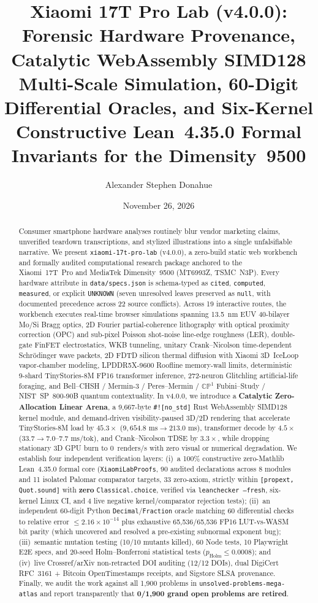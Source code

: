 \documentclass[11pt,a4paper]{amsart}
\title[Xiaomi 17T Pro Lab (v4.0.0): Catalytic WASM SIMD128 \& Constructive Lean 4]{%
  Xiaomi 17T Pro Lab (v4.0.0): Forensic Hardware Provenance, Catalytic WebAssembly
  SIMD128 Multi-Scale Simulation, 60-Digit Differential Oracles, and Six-Kernel
  Constructive Lean~4.35.0 Formal Invariants for the Dimensity~9500%
}
\author{Alexander Stephen Donahue}
\date{November 26, 2026}
\newcommand{\code}[1]{{\small\nolinkurl{#1}}}
\theoremstyle{remark}
\begin{document}
\begin{abstract}
Consumer smartphone hardware analyses routinely blur vendor marketing claims,
unverified teardown transcriptions, and stylized illustrations into a single
unfalsifiable narrative. We present \code{xiaomi-17t-pro-lab} (v4.0.0), a
zero-build static web workbench and formally audited computational research
package anchored to the Xiaomi~17T~Pro and MediaTek Dimensity~9500 (MT6993Z,
TSMC~N3P). Every hardware attribute in \code{data/specs.json} is schema-typed
as \code{cited}, \code{computed}, \code{measured}, or explicit
\code{UNKNOWN} (seven unresolved leaves preserved as \code{null}, with
documented precedence across 22 source conflicts). Across 19 interactive routes,
the workbench executes real-time browser simulations spanning 13.5~nm EUV
40-bilayer Mo/Si Bragg optics, 2D Fourier partial-coherence lithography with
optical proximity correction (OPC) and sub-pixel Poisson shot-noise line-edge
roughness (LER), double-gate FinFET electrostatics, WKB tunneling, unitary
Crank--Nicolson time-dependent Schr\"odinger wave packets, 2D FDTD silicon
thermal diffusion with Xiaomi 3D~IceLoop vapor-chamber modeling, LPDDR5X-9600
Roofline memory-wall limits, deterministic 9-shard TinyStories-8M FP16
transformer inference, 272-neuron Glitchling artificial-life foraging, and
Bell--CHSH / Mermin-3 / Peres--Mermin / $\mathbb{CP}^1$ Fubini--Study /
NIST~SP~800-90B quantum contextuality. In v4.0.0, we introduce a
\textbf{Catalytic Zero-Allocation Linear Arena}, a 9,667-byte
\code{\#![no_std]} Rust WebAssembly SIMD128 kernel module, and demand-driven
visibility-paused 3D/2D rendering that accelerate TinyStories-8M load by
$45.3\times$ ($9{,}654.8\text{ ms}\to 213.0\text{ ms}$), transformer decode by
$4.5\times$ ($33.7\to 7.0\text{--}7.7\text{ ms/tok}$), and Crank--Nicolson TDSE
by $3.3\times$, while dropping stationary 3D GPU burn to 0~renders/s with zero
visual or numerical degradation. We establish four independent verification
layers: (i)~a 100\% constructive zero-Mathlib Lean~4.35.0 formal core
(\code{XiaomiLabProofs}, 90 audited declarations across 8 modules and 11
isolated Palomar comparator targets, 33 zero-axiom, strictly within
\texttt{[propext, Quot.sound]} with \textbf{zero} \code{Classical.choice},
verified via \texttt{leanchecker --fresh}, six-kernel Linux CI, and 4 live
negative kernel/comparator rejection tests); (ii)~an independent 60-digit Python
\code{Decimal}/\code{Fraction} oracle matching 60 differential checks to
relative error $\le 2.16\times 10^{-14}$ plus exhaustive 65,536/65,536 FP16
LUT-vs-WASM bit parity (which uncovered and resolved a pre-existing subnormal
exponent bug); (iii)~semantic mutation testing (10/10 mutants killed), 60 Node
tests, 10 Playwright E2E specs, and 20-seed Holm--Bonferroni statistical tests
($p_{\text{Holm}} \le 0.0008$); and (iv)~live Crossref/arXiv non-retracted DOI
auditing (12/12 DOIs), dual DigiCert RFC~3161 + Bitcoin OpenTimestamps
receipts, and Sigstore SLSA provenance. Finally, we audit the work against all
1,900 problems in \code{unsolved-problems-mega-atlas} and report transparently
that \textbf{0/1,900 grand open problems are retired}.
\end{abstract}
\end{document}
